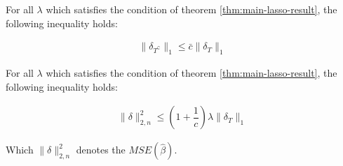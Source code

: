 \begin{claim}
\label{claim:lasso-claim-1}
For all $\lambda$ which satisfies the condition of theorem \ref{thm:main-lasso-result}, the following inequality holds:

\begin{align*}
\|\delta_{T^{\complement}}\|_1 \leq \bar{c} \|\delta_{T}\|_1
\end{align*}
\end{claim}

\begin{claim}
\label{claim:lasso-claim-2}
For all $\lambda$ which satisfies the condition of theorem \ref{thm:main-lasso-result}, the following inequality holds:

\begin{align*}
\|\delta\|_{2, n}^2 \leq \left(1 + \dfrac{1}{c}\right) \lambda \|\delta_T\|_1
\end{align*}

Which $\|\delta\|_{2, n}^2$ denotes the $MSE(\hat{\beta})$.
\end{claim}